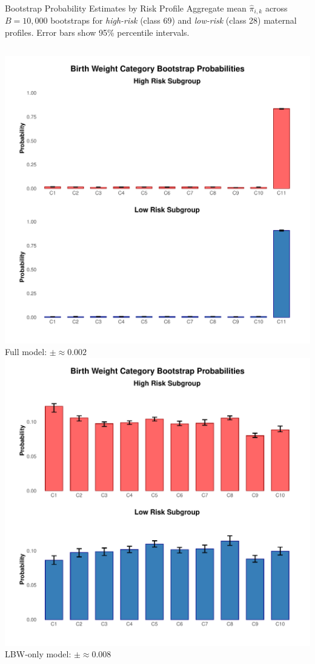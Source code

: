 \documentclass[aspectratio=169,professionalfonts]{beamer}
\begin{document}
\begin{frame}{Bootstrap Probability Estimates by Risk Profile}
\small Aggregate mean $\hat{\pi}_{i,k}$ across $B=10,000$ bootstraps for \emph{high-risk} (class 69) and \emph{low-risk} (class 28) maternal profiles. Error bars show 95\% percentile intervals.

\begin{columns}[T]
    \centering
    \includegraphics[width=\linewidth]{plots/high_low_risk_full.pdf}\\[-2pt]
    {\footnotesize Full model: $\pm \approx 0.002$}
    \centering
    \includegraphics[width=\linewidth]{plots/high_low_risk_small.pdf}\\[-2pt]
    {\footnotesize LBW‑only model: $\pm \approx 0.008$}
\end{columns}
\end{frame}
\end{document}
